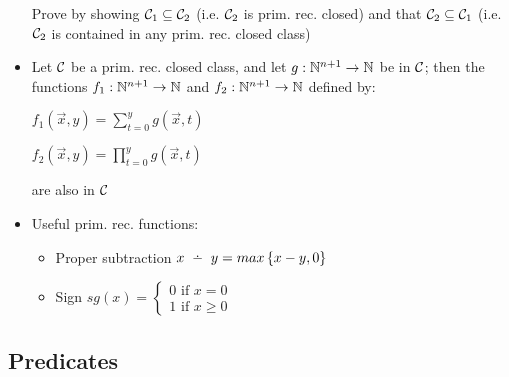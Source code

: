\begin{itemize}
	Prove by showing $ \mathcal{C}_1 \subseteq \mathcal{C}_2 $ (i.e. $ \mathcal{C}_2 $ is prim. rec. closed) and that $ \mathcal{C}_2 \subseteq \mathcal{C}_1 $ (i.e. $ \mathcal{C}_2 $ is contained in any prim. rec. closed class)
	
	\item Let $ \mathcal{C} $ be a prim. rec. closed class, and let $ g: \mathbb{N}^{n+1} \to \mathbb{N} $ be in $ \mathcal{C} $; then the functions $ f_1: \mathbb{N}^{n+1} \to \mathbb{N} $ and $ f_2: \mathbb{N}^{n+1} \to \mathbb{N} $ defined by:
	
	$ f_1(\vec{x}, y) = \sum_{t=0}^{y} g(\vec{x}, t) $
	
	$ f_2(\vec{x}, y) = \prod_{t=0}^{y} g(\vec{x}, t) $
	
	are also in $ \mathcal{C} $
	
	\item Useful prim. rec. functions:
	
	\begin{itemize}
		\item Proper subtraction $ x \monus y = max\set{x - y, 0} $
		
		\item Sign $ sg(x) = \begin{cases}
		0 \text{ if } x = 0\\
		1 \text{ if } x \ge 0
		\end{cases} $
		
	\end{itemize}
	
\end{itemize}

\newpage

\subsection{Predicates}

